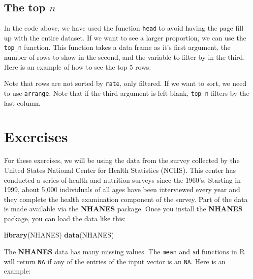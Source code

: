 \documentclass[
]{krantz}
\newenvironment{Shaded}{\begin{snugshade}}{\end{snugshade}}
\newcommand{\DecValTok}[1]{\textcolor[rgb]{0.06,0.06,0.06}{#1}}
\newcommand{\KeywordTok}[1]{\textcolor[rgb]{0.27,0.27,0.27}{\textbf{#1}}}
\newcommand{\NormalTok}[1]{#1}
\newcommand{\OperatorTok}[1]{\textcolor[rgb]{0.43,0.43,0.43}{\textbf{#1}}}
\newcommand{\StringTok}[1]{\textcolor[rgb]{0.5,0.5,0.5}{#1}}
\begin{document}
\hypertarget{the-top-n}{%
\subsection{\texorpdfstring{The top \(n\)}{The top n}}\label{the-top-n}}

In the code above, we have used the function \texttt{head} to avoid having the page fill up with the entire dataset. If we want to see a larger proportion, we can use the \texttt{top\_n} function. This function takes a data frame as it's first argument, the number of rows to show in the second, and the variable to filter by in the third. Here is an example of how to see the top 5 rows:

\begin{Shaded}
\end{Shaded}

Note that rows are not sorted by \texttt{rate}, only filtered. If we want to sort, we need to use \texttt{arrange}.
Note that if the third argument is left blank, \texttt{top\_n} filters by the last column.

\hypertarget{exercises-11}{%
\section{Exercises}\label{exercises-11}}

For these exercises, we will be using the data from the survey collected by the United States National Center for Health Statistics (NCHS). This center has conducted a series of health and nutrition surveys since the 1960's. Starting in 1999, about 5,000 individuals of all ages have been interviewed every year and they complete the health examination component of the survey. Part of the data is made available via the \textbf{NHANES} package. Once you install the \textbf{NHANES} package, you can load the data like this:

\begin{Shaded}
\begin{Highlighting}[]
\KeywordTok{library}\NormalTok{(NHANES)}
\KeywordTok{data}\NormalTok{(NHANES)}
\end{Highlighting}
\end{Shaded}

The \textbf{NHANES} data has many missing values. The \texttt{mean} and \texttt{sd} functions in R will return \texttt{NA} if any of the entries of the input vector is an \texttt{NA}. Here is an example:
\end{document}
